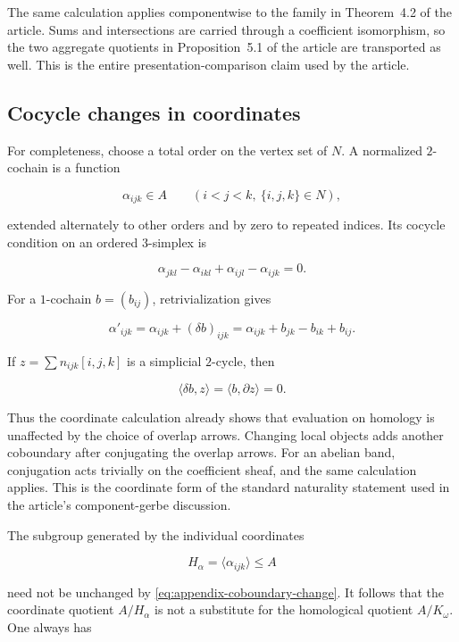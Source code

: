 The same calculation applies componentwise to the family in Theorem~4.2 of
the article.  Sums and
intersections are carried through a coefficient isomorphism, so the two
aggregate quotients in Proposition~5.1 of the article are transported
as well.  This is the entire presentation-comparison claim used by the
article.

\subsection{Cocycle changes in coordinates}

For completeness, choose a total order on the vertex set of \(N\).  A
normalized \(2\)-cochain is a function

\[
 \alpha_{ijk}\in A
 \qquad(i<j<k,\ \{i,j,k\}\in N),
\]

extended alternately to other orders and by zero to repeated indices.  Its
cocycle condition on an ordered \(3\)-simplex is

\begin{equation}\label{eq:appendix-cocycle-identity}
 \alpha_{jkl}-\alpha_{ikl}+\alpha_{ijl}-\alpha_{ijk}=0.
\end{equation}

For a \(1\)-cochain \(b=(b_{ij})\), retrivialization gives

\begin{equation}\label{eq:appendix-coboundary-change}
 \alpha'_{ijk}
 =\alpha_{ijk}+(\delta b)_{ijk}
 =\alpha_{ijk}+b_{jk}-b_{ik}+b_{ij}.
\end{equation}

If \(z=\sum n_{ijk}[i,j,k]\) is a simplicial \(2\)-cycle, then

\[
 \langle\delta b,z\rangle
 =\langle b,\partial z\rangle=0.
\]

Thus the coordinate calculation already shows that evaluation on homology
is unaffected by the choice of overlap arrows.  Changing local objects adds
another coboundary after conjugating the overlap arrows.  For an abelian
band, conjugation acts trivially on the coefficient sheaf, and the same
calculation applies.  This is the coordinate form of the standard
naturality statement used in the article's component-gerbe discussion.

The subgroup generated by the individual coordinates

\[
 H_\alpha=\langle\alpha_{ijk}\rangle\le A
\]

need not be unchanged by \eqref{eq:appendix-coboundary-change}.  It follows
that the coordinate quotient \(A/H_\alpha\) is not a substitute for the
homological quotient \(A/K_\omega\).  One always has

